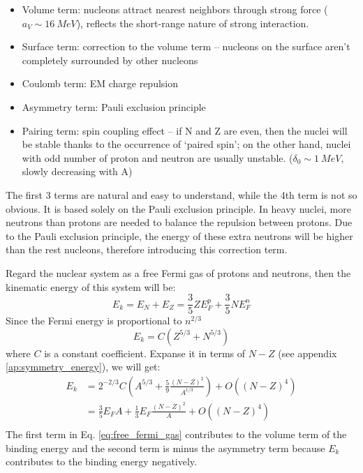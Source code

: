 \begin{itemize}
    \color{black} \item Volume term: nucleons attract nearest neighbors 
	through strong force ($a_V \sim 16\ MeV$), reflects the short-range
	nature of strong interaction.
    \color{blue}  \item Surface term: correction to the volume term -- nucleons 
	on the surface aren't completely surrounded by other nucleons
    \color{green} \item Coulomb term: EM charge repulsion
    \color{red}   \item Asymmetry term: Pauli exclusion principle
    \color{cyan}  \item Pairing term: spin coupling effect -- if N and Z are even,
	then the nuclei will be stable thanks to the occurrence of `paired spin';
	on the other hand, nuclei with odd number of proton and neutron are usually
	unstable. ($\delta_0 \sim 1\ MeV$, slowly decreasing with A)
\end{itemize}

The first 3 terms are natural and easy to understand, while the 4th term is 
not so obvious. It is based solely on the Pauli exclusion principle. In heavy nuclei,
more neutrons than protons are needed to balance the repulsion between protons.
Due to the Pauli exclusion principle, the energy of these extra neutrons will be 
higher than the rest nucleons, therefore introducing this correction term.

Regard the nuclear system as a free Fermi gas of protons and neutrons, then the 
kinematic energy of this system will be:
\begin{equation}
    E_k = E_N + E_Z = \frac{3}{5}ZE_F^p + \frac{3}{5}NE_F^n
\end{equation}
Since the Fermi energy is proportional to $n^{2/3}$
\begin{equation}
    E_k = C(Z^{5/3} + N^{5/3})
\end{equation}
where $C$ is a constant coefficient. 
Expanse it in terms of $N-Z$ (see appendix \ref{ap:symmetry_energy}), we will get:
\begin{equation}
    \begin{aligned}
	E_k &= 2^{-2/3}C\left(A^{5/3} + \frac{5}{9}\frac{(N-Z)^2}{A^{1/3}} \right) + O((N-Z)^4) \\
	    &= \frac{3}{5} E_F A + \frac{1}{3}E_F\frac{(N-Z)^2}{A} + O((N-Z)^4) \\
    \end{aligned}
    \label{eq:free_fermi_gas}
\end{equation}
The first term in Eq. \ref{eq:free_fermi_gas} contributes to the volume term 
of the binding energy and the second term is minus the 
asymmetry term because $E_k$ contributes to the binding energy negatively.

